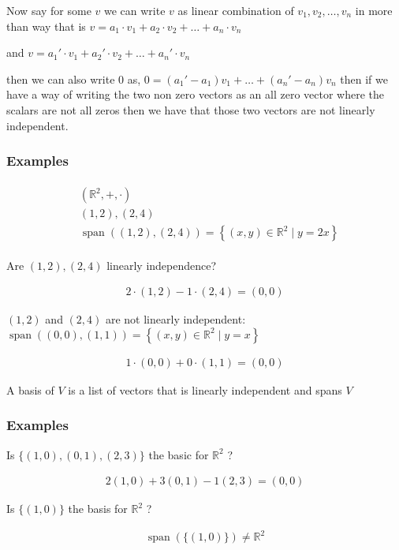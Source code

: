 \documentclass[12pt,a4paper]{article}
\begin{document}
     Now say for some \(v\) we can write \(v\) as linear combination of \(v_{1},v_{2},\ldots,v_{n}\) in more than way that is    \(v=a_{1} \cdot v_{1} + a_{2} \cdot v_{2} + \ldots + a_{n} \cdot v_{n}\)
     
     and \(v=a_{1}' \cdot v_{1} + a_{2}' \cdot v_{2} + \ldots + a_{n}' \cdot v_{n}\)  

     then we can also write 0 as, \(0=(a_{1}'-a_{1})v_{1} + \ldots + (a_{n}'-a_{n})v_{n}\)  
     then if we have a way of writing the two non zero vectors as an all zero vector where the scalars are not all zeros then we have that those two vectors are not linearly independent.
     \subsubsection{Examples} 
     \begin{align*}
        \begin{aligned}
        & \left(\mathbb{R}^2,+, \cdot\right) \\
        & (1,2),(2,4) \\
        & \operatorname{span}((1,2),(2,4))=\left\{(x, y) \in \mathbb{R}^2 \mid y=2 x\right\}
        \end{aligned}
        \end{align*}
        
        
        Are \((1,2),(2,4)\) linearly independence?
        
        \begin{align*}
        2 \cdot(1,2)-1 \cdot(2,4)=(0,0)
        \end{align*}
        
        \((1,2)\) and \((2,4)\) are not linearly independent:
        \(\operatorname{span}((0,0),(1,1))=\left\{(x, y) \in \mathbb{R}^2 \mid y=x\right\}\)
        
        \begin{align*}
        1 \cdot(0,0)+0 \cdot(1,1)=(0,0)
        \end{align*}

        A basis of \(V\) is a list of vectors that is linearly independent and spans \(V\) 
        \subsubsection{Examples}
        Is \(\{(1,0),(0,1),(2,3)\}\) the basic for \(\mathbb{R}^2\) ?

\begin{align*}
2(1,0)+3(0,1)-1(2,3)=(0,0)
\end{align*}


Is \(\{(1,0)\}\) the basis for \(\mathbb{R}^2\) ?

\begin{align*}
\operatorname{span}(\{(1,0)\}) \neq \mathbb{R}^2
\end{align*}
  
\end{document}
